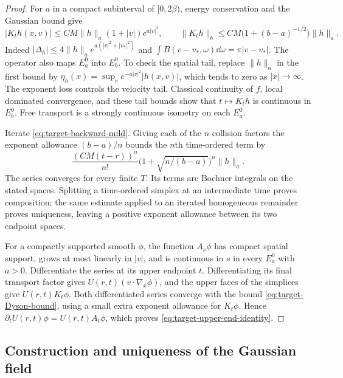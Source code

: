 \begin{proof}
For $a$ in a compact subinterval of $[0,2\beta)$, energy conservation
and the Gaussian bound give
\begin{equation}\label{eq:target-K-estimate}
 |K_th(x,v)|\le CM\|h\|_a(1+|v|)e^{a|v|^2},
 \qquad
 \|K_th\|_b\le CM\bigl(1+(b-a)^{-1/2}\bigr)\|h\|_a.
\end{equation}
Indeed $|\Delta_h|\le4\|h\|_a e^{a(|v|^2+|v_*|^2)}$ and
$\int B(v-v_*,\omega)\dd\omega=\pi|v-v_*|$.
The operator also maps $E_a^0$ into $E_b^0$.  To check the spatial
tail, replace $\|h\|_a$ in the first bound by
$\eta_h(x)=\sup_v e^{-a|v|^2}|h(x,v)|$, which tends to zero as
$|x|\to\infty$.  The exponent loss controls the velocity tail.
Classical continuity of $f$, local dominated convergence, and these
tail bounds show that $t\mapsto K_th$ is continuous in $E_b^0$.
Free transport is a strongly continuous isometry on each $E_a^0$.

Iterate \eqref{eq:target-backward-mild}.  Giving each of the $n$
collision factors the exponent allowance $(b-a)/n$ bounds the
$n$th time-ordered term by
\begin{equation}\label{eq:target-Dyson-bound}
 \frac{(CM(t-r))^n}{n!}
       \bigl(1+\sqrt{n/(b-a)}\bigr)^n\|h\|_a.
\end{equation}
The series converges for every finite $T$.  Its terms are Bochner
integrals on the stated spaces.  Splitting a time-ordered simplex at
an intermediate time proves composition; the same estimate applied
to an iterated homogeneous remainder proves uniqueness, leaving a
positive exponent allowance between its two endpoint spaces.

For a compactly supported smooth $\phi$, the function $A_s\phi$
has compact spatial support, grows at most linearly in $|v|$, and is
continuous in $s$ in every $E_a^0$ with $a>0$.  Differentiate the
series at its upper endpoint $t$.  Differentiating its final transport
factor gives $U(r,t)(v\cdot\nabla_x\phi)$, and the upper faces of
the simplices give $U(r,t)K_t\phi$.  Both differentiated series
converge with the bound \eqref{eq:target-Dyson-bound}, using a small
extra exponent allowance for $K_t\phi$.  Hence
$\partial_tU(r,t)\phi=U(r,t)A_t\phi$, which proves
\eqref{eq:target-upper-end-identity}.
\end{proof}

\subsection{Construction and uniqueness of the Gaussian field}

